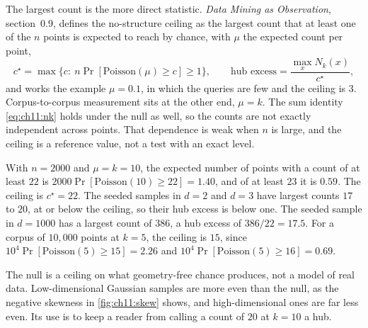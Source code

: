 The largest count is the more direct statistic. \emph{Data Mining as Observation}, section~0.9, defines the no-structure ceiling as the largest count that at least one of the $n$ points is expected to reach by chance, with $\mu$ the expected count per point,
\begin{equation}\label{eq:ch11:ceiling}
c^\star=\max\big\{c:\ n\Pr[\mathrm{Poisson}(\mu)\ge c]\ge1\big\},\qquad
\text{hub excess}=\frac{\max_x N_k(x)}{c^\star},
\end{equation}
and works the example $\mu=0.1$, in which the queries are few and the ceiling is $3$. Corpus-to-corpus measurement sits at the other end, $\mu=k$. The sum identity \cref{eq:ch11:nk} holds under the null as well, so the counts are not exactly independent across points. That dependence is weak when $n$ is large, and the ceiling is a reference value, not a test with an exact level.

\begin{example}\label{ex:ch11:ceiling}
With $n=2000$ and $\mu=k=10$, the expected number of points with a count of at least $22$ is $2000\Pr[\mathrm{Poisson}(10)\ge22]=1.40$, and of at least $23$ it is $0.59$. The ceiling is $c^\star=22$. The seeded samples in $d=2$ and $d=3$ have largest counts $17$ to $20$, at or below the ceiling, so their hub excess is below one. The seeded sample in $d=1000$ has a largest count of $386$, a hub excess of $386/22=17.5$. For a corpus of $10{,}000$ points at $k=5$, the ceiling is $15$, since $10^4\Pr[\mathrm{Poisson}(5)\ge15]=2.26$ and $10^4\Pr[\mathrm{Poisson}(5)\ge16]=0.69$.
\end{example}

The null is a ceiling on what geometry-free chance produces, not a model of real data. Low-dimensional Gaussian samples are more even than the null, as the negative skewness in \cref{fig:ch11:skew} shows, and high-dimensional ones are far less even. Its use is to keep a reader from calling a count of $20$ at $k=10$ a hub.


